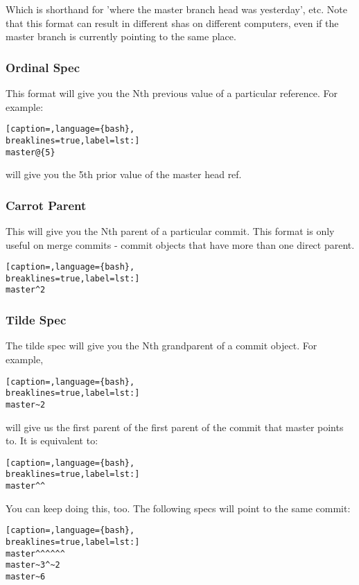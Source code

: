 Which is shorthand for 'where the master branch head was yesterday', etc. Note
that this format can result in different shas on different computers, even if
the master branch is currently pointing to the same place.

\subsubsection{Ordinal Spec}
This format will give you the Nth previous value of a particular reference. For
example:
\lstset{basicstyle=\scriptsize, numbers=none, captionpos=b, tabsize=4}
\begin{lstlisting}[caption=,language={bash},
breaklines=true,label=lst:]
master@{5}
\end{lstlisting}

will give you the 5th prior value of the master head ref.

\subsubsection{Carrot Parent}
This will give you the Nth parent of a particular commit. This format is only
useful on merge commits - commit objects that have more than one direct parent.
\lstset{basicstyle=\scriptsize, numbers=none, captionpos=b, tabsize=4}
\begin{lstlisting}[caption=,language={bash},
breaklines=true,label=lst:]
master^2
\end{lstlisting}

\subsubsection{Tilde Spec}
The tilde spec will give you the Nth grandparent of a commit object. For
example,
\lstset{basicstyle=\scriptsize, numbers=none, captionpos=b, tabsize=4}
\begin{lstlisting}[caption=,language={bash},
breaklines=true,label=lst:]
master~2
\end{lstlisting}

will give us the first parent of the first parent of the commit that master
points to. It is equivalent to:
\lstset{basicstyle=\scriptsize, numbers=none, captionpos=b, tabsize=4}
\begin{lstlisting}[caption=,language={bash},
breaklines=true,label=lst:]
master^^
\end{lstlisting}

You can keep doing this, too. The following specs will point to the same
commit:
\lstset{basicstyle=\scriptsize, numbers=none, captionpos=b, tabsize=4}
\begin{lstlisting}[caption=,language={bash},
breaklines=true,label=lst:]
master^^^^^^
master~3^~2
master~6
\end{lstlisting}

